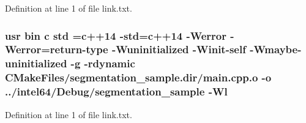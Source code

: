 Definition at line 1 of file link.\+txt.

\subsubsection[{\texorpdfstring{std}{std}}]{\setlength{\rightskip}{0pt plus 5cm}usr bin {\bf c} std ={\bf c}++14 -\/std={\bf c}++14 -\/Werror -\/Werror=return-\/type -\/Wuninitialized -\/Winit-\/self -\/Wmaybe-\/uninitialized -\/g -\/rdynamic C\+Make\+Files/segmentation\+\_\+sample.\+dir/main.\+cpp.\+o -\/o ../intel64/Debug/segmentation\+\_\+sample -\/{\bf Wl}}\hypertarget{segmentation__sample_2CMakeFiles_2segmentation__sample_8dir_2link_8txt_a1ccfea5f558575a112db71eeb271fabf}{}\label{segmentation__sample_2CMakeFiles_2segmentation__sample_8dir_2link_8txt_a1ccfea5f558575a112db71eeb271fabf}


Definition at line 1 of file link.\+txt.

